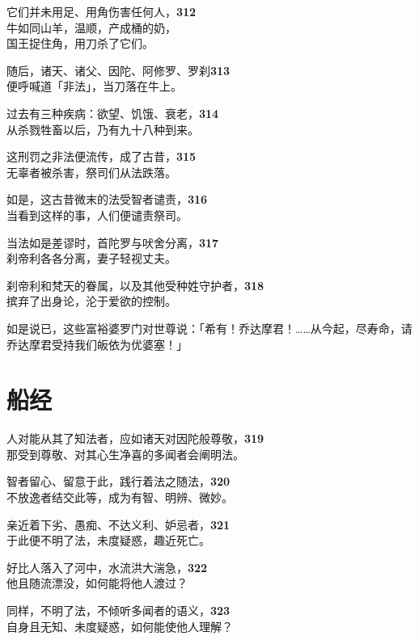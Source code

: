 它们并未用足、用角伤害任何人，\hfill{\grayfootnotesize \textbf{312}} \\
牛如同山羊，温顺，产成桶的奶，\\
国王捉住角，用刀杀了它们。

随后，诸天、诸父、因陀、阿修罗、罗刹\hfill{\grayfootnotesize \textbf{313}} \\
便呼喊道「非法」，当刀落在牛上。


过去有三种疾病：欲望、饥饿、衰老，\hfill{\grayfootnotesize \textbf{314}} \\
从杀戮牲畜以后，乃有九十八种到来。


这刑罚之非法便流传，成了古昔，\hfill{\grayfootnotesize \textbf{315}} \\
无辜者被杀害，祭司们从法跌落。


如是，这古昔微末的法受智者谴责，\hfill{\grayfootnotesize \textbf{316}} \\
当看到这样的事，人们便谴责祭司。


当法如是差谬时，首陀罗与吠舍分离，\hfill{\grayfootnotesize \textbf{317}} \\
刹帝利各各分离，妻子轻视丈夫。


刹帝利和梵天的眷属，以及其他受种姓守护者，\hfill{\grayfootnotesize \textbf{318}} \\
摈弃了出身论，沦于爱欲的控制。


如是说已，这些富裕婆罗门对世尊说：「希有！乔达摩君！……从今起，尽寿命，请乔达摩君受持我们皈依为优婆塞！」


\section{船经}


人对能从其了知法者，应如诸天对因陀般尊敬，\hfill{\grayfootnotesize \textbf{319}} \\
那受到尊敬、对其心生净喜的多闻者会阐明法。


智者留心、留意于此，践行着法之随法，\hfill{\grayfootnotesize \textbf{320}} \\
不放逸者结交此等，成为有智、明辨、微妙。


亲近着下劣、愚痴、不达义利、妒忌者，\hfill{\grayfootnotesize \textbf{321}} \\
于此便不明了法，未度疑惑，趣近死亡。


好比人落入了河中，水流洪大湍急，\hfill{\grayfootnotesize \textbf{322}} \\
他且随流漂没，如何能将他人渡过？


同样，不明了法，不倾听多闻者的语义，\hfill{\grayfootnotesize \textbf{323}} \\
自身且无知、未度疑惑，如何能使他人理解？


